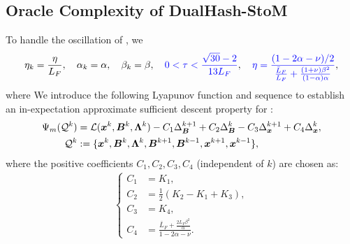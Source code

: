 \subsection{Oracle Complexity of DualHash-StoM}
\label{Section: complexity of StoM}
 To handle the oscillation of \blue{$\calL$}, we 
\begin{equation}
    \label{Eq: the parameters conditions of dualhash-sgdm in suppl}
    \eta_{k}= \frac{\eta}{L_{F}},\quad \alpha_{k}= \alpha,\quad \beta_{k}= \beta,\quad \blue{0<\tau<\frac{\sqrt{30}-2}{13L_F}},\quad \blue{\eta=\frac{(1 - 2\alpha - \nu)/2}{\frac{\bar{L}_{F}}{L_{F}} + \frac{(1 + \nu)\beta^{2}}{(1 - \alpha)\alpha}}},
\end{equation}
where   We  introduce the following Lyapunov function and sequence to establish an in-expectation approximate sufficient descent property for :
\begin{align}
    \Psi_m(\mathcal{Q}^{k}) &= \mathcal{L}(\bx^{k}, \bm{B}^{k}, \bLmbd^{k})
        - C_{1}\Delta_{\bB}^{k+1} + C_{2}\Delta_{\bB}^{k}
        - C_{3}\Delta_{\bm{x}}^{k+1} + C_{4}\Delta_{\bm{x}}^{k},
        \label{Eq: the Lyapunov function in SGDM} \\
    \mathcal{Q}^{k} &:= \{\bx^{k}, \bB^{k}, \bm{\Lambda}^{k},
        \bB^{k+1}, \bB^{k-1}, \bx^{k+1}, \bx^{k-1}\}, \notag
\end{align}where the positive coefficients $C_1, C_2, C_3, C_4$ (independent of $k$) are chosen as:
\begin{align}
    \label{Eq: the coefficients of the Lyapunov function in SGDM}
    \begin{cases}
        C_{1} &= K_{1},\\
        C_{2} &= \frac{1}{2}(K_{2} - K_{1} + K_{3}),\\
        C_{3} &= K_{4},\\
        C_{4} &= \frac{\bar{L}_F + \frac{2L_F \beta^2}{\alpha}}{1 - 2\alpha - \nu}.
    \end{cases}
\end{align}
